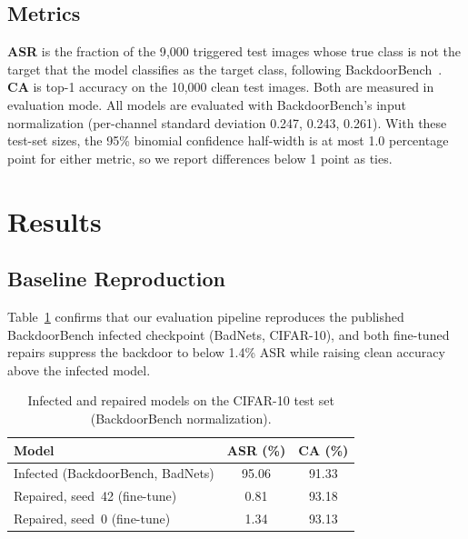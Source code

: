 \documentclass[conference,a4paper]{IEEEtran}  %
\begin{document}
\subsection{Metrics}
\label{sec:metrics}

\textbf{ASR} is the fraction of the 9{,}000 triggered test images whose true class is not the target that the model classifies as the target class, following BackdoorBench~\cite{backdoorbench2024}.
\textbf{CA} is top-1 accuracy on the 10{,}000 clean test images. Both are
measured in evaluation mode. All models are evaluated with BackdoorBench's
input normalization (per-channel standard deviation 0.247, 0.243, 0.261).
With these test-set sizes, the 95\%
binomial confidence half-width is at most 1.0 percentage point for
either metric, so we report differences below 1 point as ties.

\section{Results}
\label{sec:results}

\subsection{Baseline Reproduction}

Table~\ref{tab:baseline} confirms that our evaluation pipeline reproduces the published BackdoorBench infected checkpoint (BadNets, CIFAR-10), and both fine-tuned repairs suppress the backdoor to below 1.4\% ASR while raising clean accuracy above the infected model.

\begin{table}[h]
\centering
\caption{Infected and repaired models on the CIFAR-10 test set (BackdoorBench normalization).}
\label{tab:baseline}
\begin{tabular}{lcc}
\toprule
Model & ASR (\%) & CA (\%) \\
\midrule
Infected (BackdoorBench, BadNets) & 95.06 & 91.33 \\
Repaired, seed~42 (fine-tune) & 0.81 & 93.18 \\
Repaired, seed~0 (fine-tune) & 1.34 & 93.13 \\
\bottomrule
\end{tabular}
\end{table}
\end{document}
